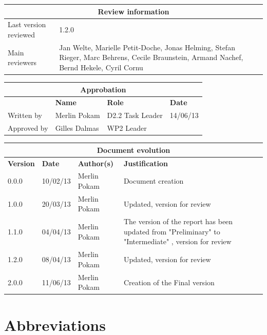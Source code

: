 \documentclass{template/openetcs_report}
\begin{document}
\begin{tabular}{|p{4.4cm}|p{8.7cm}|}
\hline
\multicolumn{2}{|c|}{\textbf{Review information}} \\
\hline
Last version reviewed & 1.2.0 \\
\hline
Main reviewers & Jan Welte,  Marielle Petit-Doche, Jonas Helming, Stefan Rieger, Marc Behrens, Cecile Braunstein, Armand Nachef, Bernd Hekele, Cyril Cornu\\
\hline
\end{tabular}

\begin{tabular}{|p{2.2cm}|p{4cm}|p{4cm}|p{2cm}|}
\hline
\multicolumn{4}{|c|}{\textbf{Approbation}} \\
\hline
  &  \textbf{Name} & \textbf{Role} & \textbf{Date}   \\
\hline  
Written by    &  Merlin Pokam & D2.2 Task Leader  & 14/06/13\\
\hline
Approved by &  Gilles Dalmas & WP2 Leader & \\
\hline
\end{tabular}

\begin{tabular}{|p{2.2cm}|p{2cm}|p{3cm}|p{5cm}|}
\hline
\multicolumn{4}{|c|}{\textbf{Document evolution}} \\
\hline
\textbf{Version} &  \textbf{Date} & \textbf{Author(s)} & \textbf{Justification}  \\
\hline  
0.0.0 & 10/02/13 & Merlin Pokam &  Document creation  \\
\hline  
1.0.0 & 20/03/13 & Merlin Pokam &  Updated, version for review  \\
\hline
1.1.0 & 04/04/13 & Merlin Pokam &  The version of the report has been updated from "Preliminary" to "Intermediate" , version for review  \\
\hline
1.2.0 & 08/04/13 & Merlin Pokam &  Updated, version for review  \\
\hline
2.0.0 & 11/06/13 & Merlin Pokam &  Creation of the Final version  \\
\hline
\end{tabular}


\tableofcontents
\listoffiguresandtables




\chapter{Abbreviations}
\end{document}
